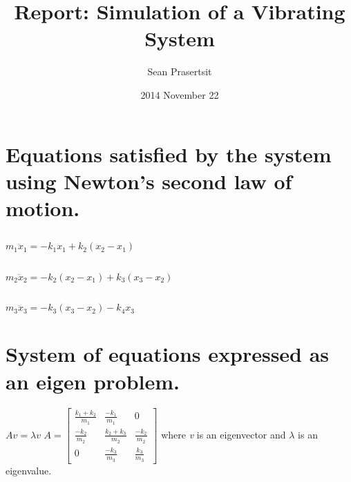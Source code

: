 \documentclass{article}
\begin{document}
\title{Report: Simulation of a Vibrating System}
\author{Sean Prasertsit}
\date{2014 November 22}
\maketitle

\section{Equations satisfied by the system using Newton's second law of motion.}
\subsection{}	\(m_1\ddot{x}_1 = -k_1x_1 + k_2(x_2 - x_1)\)
\subsection{}	\(m_2\ddot{x}_2 = -k_2(x_2 - x_1) + k_3(x_3 - x_2)\)
\subsection{}	\(m_3\ddot{x}_3 = -k_3(x_3 - x_2) - k_4x_3\)

\section{System of equations expressed as an eigen problem.}
\(Av = \lambda v\) \newline \newline
\(A = 
	\begin{bmatrix}
	\frac{k_1 + k_2}{m_1} 	& \frac{-k_1}{m_1} 		& 0 \\
	\frac{-k_2}{m_2} 		& \frac{k_2 + k_3}{m_2} & \frac{-k_2}{m_2} \\
	0						& \frac{-k_3}{m_3}		& \frac{k_3}{m_3}
	\end{bmatrix} \)
where \textit{v} is an eigenvector and \(\lambda \) is an eigenvalue.
\end{document}
